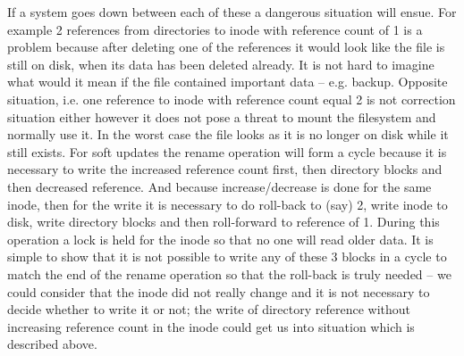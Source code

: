 \begin{itemize}
If a system goes down between each of these a dangerous situation will ensue.
For example 2 references from directories to inode with reference count of 1 is
a problem because after deleting one of the references it would look like the
file is still on disk, when its data has been deleted already.
It is not hard to imagine what would it mean if the file contained important
data -- e.g. backup.
Opposite situation, i.e. one reference to inode with reference count equal 2 is
not correction situation either however it does not pose a threat to mount the
filesystem and normally use it. In the worst case the file looks as it is no
longer on disk while it still exists. For soft updates the rename operation will
form a cycle because it is necessary to write the increased reference count
first, then directory blocks and then decreased reference. And because
increase/decrease is done for the same inode, then for the write it is necessary
to do roll-back to (say) 2, write inode to disk, write directory blocks and then
roll-forward to reference of 1. During this operation a lock is held for the
inode so that no one will read older data. It is simple to show that it is not
possible to write any of these 3 blocks in a cycle to match the end of the
rename operation so that the roll-back is truly needed -- we could consider that
the inode did not really change and it is not necessary to decide whether to
write it or not; the write of directory reference without increasing reference
count in the inode could get us into situation which is described above.
\end{itemize}

\endinput
